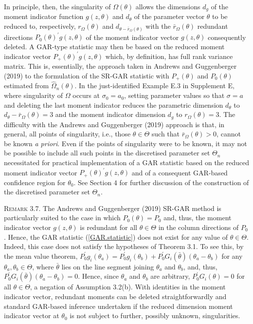 \documentclass[hidelinks, 11 pt, a4paper, pdflatex]{article}
\begin{document}
{   In principle, then, the singularity of $\Omega(\theta)$ allows the dimensions $d_g$ of the moment indicator function $g(z,\theta)$ and $d_{\theta}$ of the parameter vector $\theta$ to be reduced to, respectively, $r_{\Omega}(\theta)$ and $d_{\theta-\bar{r}_{\Omega}(\theta)}$ with the $\bar{r}_{\Omega}(\theta)$ redundant directions $P_0(\theta)^{\prime}g(z,\theta)$ of the moment indicator vector $g(z,\theta)$ consequently deleted. A GAR-type statistic may then be based on the reduced moment indicator vector $P_{+}(\theta)^{\prime}g(z,\theta)$ which, by definition, has full rank variance matrix. This is, essentially, the approach taken in Andrews and Guggenberger (2019) to the formulation of the SR-GAR statistic with $P_{+}(\theta)$ and $P_{0}(\theta)$ estimated from $\hat{\Omega}_n(\theta)$. In the just-identified Example E.3 in Supplement E, where singularity of $\Omega$ occurs at $\sigma_0 = a_0$, setting parameter values so that $\sigma = a$ and deleting the last moment indicator reduces the parametric dimension $d_{\theta}$ to $d_{\theta}-\bar{r}_{\Omega}(\theta) = 3$ and the moment indicator dimension $d_g$ to $r_{\Omega}(\theta) = 3$. The difficulty with the Andrews and Guggenberger (2019) approach is that, in general, all points of singularity, i.e., those $\theta \in \Theta$ such that $\bar{r}_{\Omega}(\theta) > 0$, cannot be known \textit{a priori}. Even if the points of singularity were to be known, it may not be possible to include all such points in the discretised parameter set $\Theta_n$ necessitated for practical implementation of a GAR statistic based on the reduced moment indicator vector $P_{+}(\theta)^{\prime}g(z,\theta)$ and of a consequent GAR-based confidence region for $\theta_0$. See Section 4 for further discussion of the construction of the discretised parameter set $\Theta_n$.

   \textsc{Remark 3.7}. The Andrews and Guggenberger (2019) SR-GAR method is particularly suited to the case in which $P_0(\theta) = P_0$
    and, thus, the moment indicator vector $g(z,\theta)$ is redundant for all $\theta \in \Theta$ in the column directions of $P_0$. Hence, the GAR statistic (\ref{GAR.statistic}) does not exist for any value of $\theta \in \Theta$. Indeed, this case does not satisfy the hypotheses of Theorem 3.1. To see this, by the mean value theorem, $P_0^{\prime}g_i(\theta_a) = P_0^{\prime}g_i(\theta_b) + P_0^{\prime}G_i(\bar{\theta})(\theta_a - \theta_b)$ for any $\theta_a,\theta_b \in \Theta$, where $\bar{\theta}$ lies on the line segment joining $\theta_a$ and $\theta_b$, and, thus, $P_0^{\prime}G_i(\bar{\theta})(\theta_a - \theta_b) = 0$. Hence, since $\theta_a$ and $\theta_b$ are arbitrary, $P_0^{\prime}G_i(\theta) = 0$ for all $\theta \in \Theta$, a negation of Assumption 3.2(b). With identities in the moment indicator vector, redundant moments can be deleted straightforwardly and standard GAR-based inference undertaken if the reduced dimension moment indicator vector at $\theta_0$ is not subject to further, possibly unknown, singularities.

}
\end{document}
